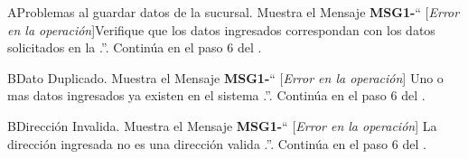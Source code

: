 

\begin{UCtrayectoriaA}{A}{Problemas al guardar datos de la sucursal.}
			\UCpaso Muestra el Mensaje {\bf MSG1-}`` [{\em Error en la operación}]Verifique que los datos ingresados correspondan con los datos solicitados en la  .''.
			\UCpaso Continúa en el paso 6 del .
		\end{UCtrayectoriaA}
\begin{UCtrayectoriaA}{B}{Dato Duplicado.}
			\UCpaso Muestra el Mensaje {\bf MSG1-}`` [{\em Error en la operación}] Uno o mas datos ingresados ya existen en el sistema  .''.
			\UCpaso Continúa en el paso 6 del .
		\end{UCtrayectoriaA}
\begin{UCtrayectoriaA}{B}{Dirección Invalida.}
			\UCpaso Muestra el Mensaje {\bf MSG1-}`` [{\em Error en la operación}] La dirección ingresada no es una dirección valida  .''.
			\UCpaso Continúa en el paso 6 del .
		\end{UCtrayectoriaA}
